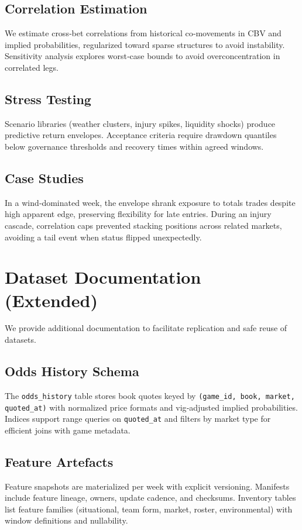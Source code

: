 \documentclass[12pt]{report}  %
\numberwithin{equation}{section}
\theoremstyle{plain}
\theoremstyle{definition}
\theoremstyle{remark}
\begin{document}
\section{Correlation Estimation}
We estimate cross‑bet correlations from historical co‑movements in CBV and implied probabilities, regularized toward sparse structures to avoid instability. Sensitivity analysis explores worst‑case bounds to avoid overconcentration in correlated legs.

\section{Stress Testing}
Scenario libraries (weather clusters, injury spikes, liquidity shocks) produce predictive return envelopes. Acceptance criteria require drawdown quantiles below governance thresholds and recovery times within agreed windows.

\section{Case Studies}
In a wind‑dominated week, the envelope shrank exposure to totals trades despite high apparent edge, preserving flexibility for late entries. During an injury cascade, correlation caps prevented stacking positions across related markets, avoiding a tail event when status flipped unexpectedly.

\chapter{Dataset Documentation (Extended)}
We provide additional documentation to facilitate replication and safe reuse of datasets.

\section{Odds History Schema}
The \texttt{odds\_history} table stores book quotes keyed by \texttt{(game\_id, book, market, quoted\_at)} with normalized price formats and vig‑adjusted implied probabilities. Indices support range queries on \texttt{quoted\_at} and filters by market type for efficient joins with game metadata.

\section{Feature Artefacts}
Feature snapshots are materialized per week with explicit versioning. Manifests include feature lineage, owners, update cadence, and checksums. Inventory tables list feature families (situational, team form, market, roster, environmental) with window definitions and nullability.
\end{document}
